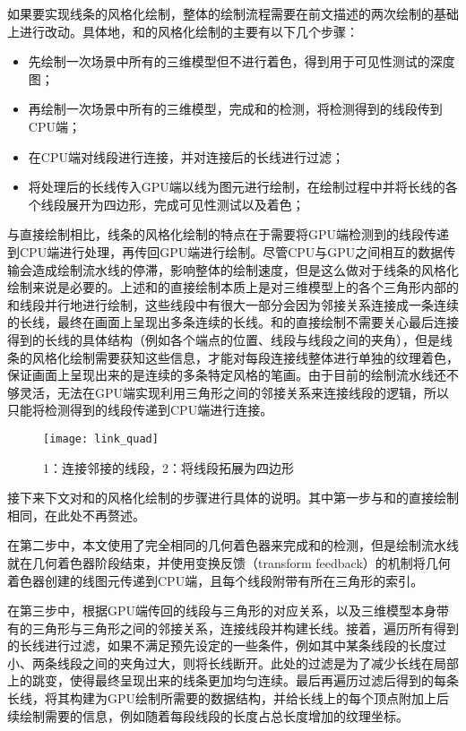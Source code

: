 如果要实现线条的风格化绘制，整体的绘制流程需要在前文描述的两次绘制的基础上进行改动。具体地，\con{}和\scon{}的风格化绘制的主要有以下几个步骤：

\begin{itemize}
    \item 先绘制一次场景中所有的三维模型但不进行着色，得到用于可见性测试的深度图；
    \item 再绘制一次场景中所有的三维模型，完成\con{}和\scon{}的检测，将检测得到的线段传到CPU端；
    \item 在CPU端对线段进行连接，并对连接后的长线进行过滤；
    \item 将处理后的长线传入GPU端以线为图元进行绘制，在绘制过程中并将长线的各个线段展开为四边形，完成可见性测试以及着色；
\end{itemize}

与直接绘制相比，线条的风格化绘制的特点在于需要将GPU端检测到的线段传递到CPU端进行处理，再传回GPU端进行绘制。尽管CPU与GPU之间相互的数据传输会造成绘制流水线的停滞，影响整体的绘制速度，但是这么做对于线条的风格化绘制来说是必要的。上述\con{}和\scon{}的直接绘制本质上是对三维模型上的各个三角形内部的\con{}和\scon{}线段并行地进行绘制，这些线段中有很大一部分会因为邻接关系连接成一条连续的长线，最终在画面上呈现出多条连续的长线。\con{}和\scon{}的直接绘制不需要关心最后连接得到的长线的具体结构（例如各个端点的位置、线段与线段之间的夹角），但是线条的风格化绘制需要获知这些信息，才能对每段连接线整体进行单独的纹理着色，保证画面上呈现出来的是连续的多条特定风格的笔画。由于目前的绘制流水线还不够灵活，无法在GPU端实现利用三角形之间的邻接关系来连接线段的逻辑，所以只能将检测得到的线段传递到CPU端进行连接。

\begin{figure}[tbh]
    \centering
    \texttt{[image: link\_quad]}
    \caption{\label{fig:link_quad}
    1：连接邻接的线段，2：将线段拓展为四边形}
\end{figure}

接下来下文对\con{}和\scon{}的风格化绘制的步骤进行具体的说明。其中第一步与\con{}和\scon{}的直接绘制相同，在此处不再赘述。

在第二步中，本文使用了完全相同的几何着色器来完成\con{}和\scon{}的检测，但是绘制流水线就在几何着色器阶段结束，并使用变换反馈（transform feedback）\cite{transformfeedback}的机制将几何着色器创建的线图元传递到CPU端，且每个线段附带有所在三角形的索引。

在第三步中，根据GPU端传回的线段与三角形的对应关系，以及三维模型本身带有的三角形与三角形之间的邻接关系，连接线段并构建长线。接着，遍历所有得到的长线进行过滤，如果不满足预先设定的一些条件，例如其中某条线段的长度过小、两条线段之间的夹角过大，则将长线断开。此处的过滤是为了减少长线在局部上的跳变，使得最终呈现出来的线条更加均匀连续。最后再遍历过滤后得到的每条长线，将其构建为GPU绘制所需要的数据结构，并给长线上的每个顶点附加上后续绘制需要的信息，例如随着每段线段的长度占总长度增加的纹理坐标。

